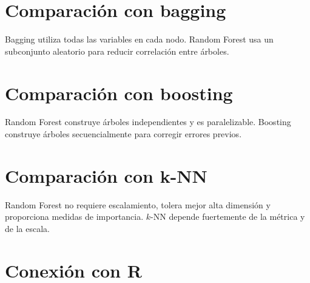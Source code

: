 \documentclass[
  spanish,
  10.5pt,
  letterpaper,
  DIV=11,
  numbers=noendperiod,
  oneside,
  open=any]{scrreprt}
\theoremstyle{definition}
\theoremstyle{definition}
\theoremstyle{plain}
\theoremstyle{remark}
\begin{document}
\section*{Comparación con bagging}\label{comparaciuxf3n-con-bagging}


Bagging utiliza todas las variables en cada nodo. Random Forest usa un
subconjunto aleatorio para reducir correlación entre árboles.

\section*{Comparación con boosting}\label{comparaciuxf3n-con-boosting}


Random Forest construye árboles independientes y es paralelizable.
Boosting construye árboles secuencialmente para corregir errores
previos.

\section*{Comparación con k-NN}\label{comparaciuxf3n-con-k-nn}


Random Forest no requiere escalamiento, tolera mejor alta dimensión y
proporciona medidas de importancia. \(k\)-NN depende fuertemente de la
métrica y de la escala.

\section*{Conexión con R}\label{conexiuxf3n-con-r-12}

\end{document}
